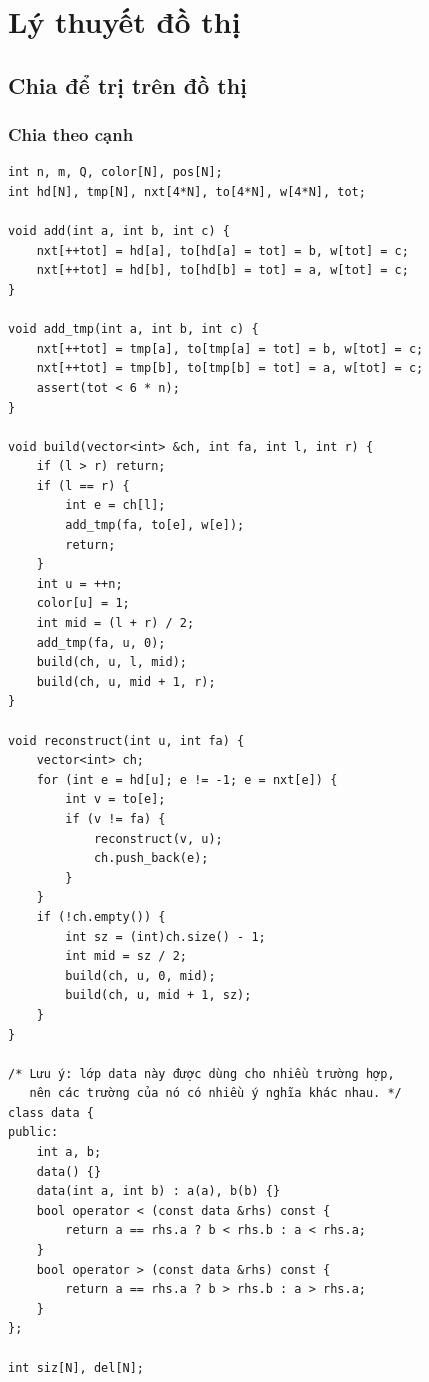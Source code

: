 \documentclass[11pt]{article}
\begin{document}
\section{Lý thuyết đồ thị}

\subsection{Chia để trị trên đồ thị}

\subsubsection{Chia theo cạnh}

\begingroup
\footnotesize
\begin{verbatim}
int n, m, Q, color[N], pos[N];
int hd[N], tmp[N], nxt[4*N], to[4*N], w[4*N], tot;

void add(int a, int b, int c) {
    nxt[++tot] = hd[a], to[hd[a] = tot] = b, w[tot] = c;
    nxt[++tot] = hd[b], to[hd[b] = tot] = a, w[tot] = c;
}

void add_tmp(int a, int b, int c) {
    nxt[++tot] = tmp[a], to[tmp[a] = tot] = b, w[tot] = c;
    nxt[++tot] = tmp[b], to[tmp[b] = tot] = a, w[tot] = c;
    assert(tot < 6 * n);
}

void build(vector<int> &ch, int fa, int l, int r) {
    if (l > r) return;
    if (l == r) {
        int e = ch[l];
        add_tmp(fa, to[e], w[e]);
        return;
    }
    int u = ++n;
    color[u] = 1;
    int mid = (l + r) / 2;
    add_tmp(fa, u, 0);
    build(ch, u, l, mid);
    build(ch, u, mid + 1, r);
}

void reconstruct(int u, int fa) {
    vector<int> ch;
    for (int e = hd[u]; e != -1; e = nxt[e]) {
        int v = to[e];
        if (v != fa) {
            reconstruct(v, u);
            ch.push_back(e);
        }
    }
    if (!ch.empty()) {
        int sz = (int)ch.size() - 1;
        int mid = sz / 2;
        build(ch, u, 0, mid);
        build(ch, u, mid + 1, sz);
    }
}

/* Lưu ý: lớp data này được dùng cho nhiều trường hợp,
   nên các trường của nó có nhiều ý nghĩa khác nhau. */
class data {
public:
    int a, b;
    data() {}
    data(int a, int b) : a(a), b(b) {}
    bool operator < (const data &rhs) const {
        return a == rhs.a ? b < rhs.b : a < rhs.a;
    }
    bool operator > (const data &rhs) const {
        return a == rhs.a ? b > rhs.b : a > rhs.a;
    }
};

int siz[N], del[N];


\end{verbatim}
\end{document}
